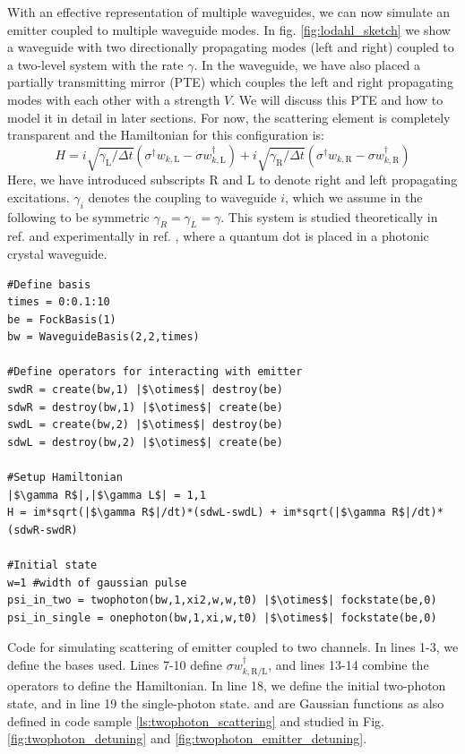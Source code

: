 With an effective representation of multiple waveguides, we can now simulate an emitter coupled to multiple waveguide modes. In fig. \ref{fig:lodahl_sketch} we show a waveguide with two directionally propagating modes (left and right) coupled to a two-level system with the rate $\gamma$. In the waveguide, we have also placed a partially transmitting mirror (PTE) which couples the left and right propagating modes with each other with a strength $V$. We will discuss this PTE and how to model it in detail in later sections. For now, the scattering element is completely transparent and the Hamiltonian for this configuration is:
\begin{equation}
    H = i \sqrt{\gamma_\mathrm{L}/\Delta t} ( \sigma^\dagger w_{k,\mathrm{L}} - \sigma w^\dagger_{k,\mathrm{L}} ) + i \sqrt{\gamma_\mathrm{R}/\Delta t} ( \sigma^\dagger w_{k,\mathrm{R}} - \sigma w^\dagger_{k,\mathrm{R}})  \label{eq:lodahl_ham}
\end{equation}
Here, we have introduced subscripts $\mathrm{R}$ and $\mathrm{L}$ to denote right and left propagating excitations. $\gamma_i$ denotes the coupling to waveguide $i$, which we assume in the following to be symmetric $\gamma_R = \gamma_L = \gamma$. This system is studied theoretically in ref. \cite{Joanesarson2020Few-photonGeometries} and experimentally in ref. \cite{LeJeannic2022DynamicalEmitter}, where a quantum dot is placed in a photonic crystal waveguide.
\begin{listing}[H]
\begin{verbatim}
#Define basis
times = 0:0.1:10
be = FockBasis(1)
bw = WaveguideBasis(2,2,times)

#Define operators for interacting with emitter
swdR = create(bw,1) |$\otimes$| destroy(be)
sdwR = destroy(bw,1) |$\otimes$| create(be)
swdL = create(bw,2) |$\otimes$| destroy(be)
sdwL = destroy(bw,2) |$\otimes$| create(be)

#Setup Hamiltonian
|$\gamma R$|,|$\gamma L$| = 1,1
H = im*sqrt(|$\gamma R$|/dt)*(sdwL-swdL) + im*sqrt(|$\gamma R$|/dt)*(sdwR-swdR)

#Initial state
w=1 #width of gaussian pulse
psi_in_two = twophoton(bw,1,xi2,w,w,t0) |$\otimes$| fockstate(be,0)
psi_in_single = onephoton(bw,1,xi,w,t0) |$\otimes$| fockstate(be,0)
\end{verbatim}
\caption{Code for simulating scattering of emitter coupled to two channels. In lines 1-3, we define the bases used. Lines 7-10 define $\sigma w^\dagger_{k,\mathrm{R}/\mathrm{L}}$, and lines 13-14 combine the operators to define the Hamiltonian. In line 18, we define the initial two-photon state, and in line 19 the single-photon state.  and  are Gaussian functions as also defined in code sample \ref{ls:twophoton_scattering} and studied in Fig. \ref{fig:twophoton_detuning} and \ref{fig:twophoton_emitter_detuning}. }
\label{ls:lodahlcode}
\end{listing}

